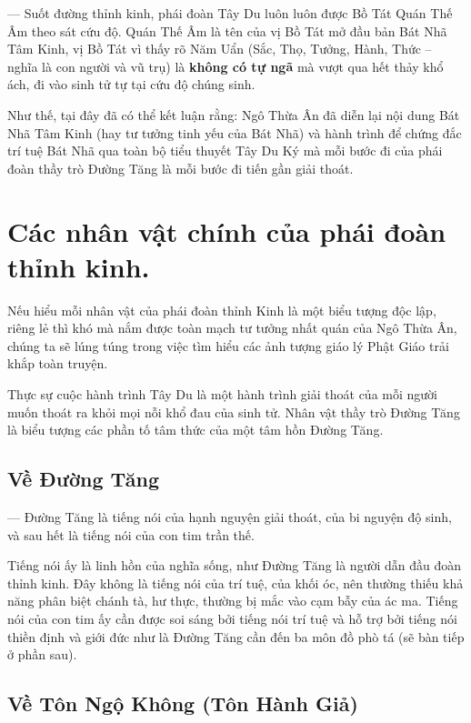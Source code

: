 --- Suốt đường thỉnh kinh, phái đoàn Tây Du luôn luôn được Bồ Tát Quán Thế Âm theo sát cứu độ. Quán Thế Âm là tên của vị Bồ Tát mở đầu bản Bát Nhã Tâm Kinh, vị Bồ Tát vì thấy rõ Năm Uẩn (Sắc, Thọ, Tưởng, Hành, Thức -- nghĩa là con người và vũ trụ) là {\bf không có tự ngã} mà vượt qua hết thảy khổ ách, đi vào sinh tử tự tại cứu độ chúng sinh.

Như thế, tại đây đã có thể kết luận rằng: Ngô Thừa Ân đã diễn lại nội dung Bát Nhã Tâm Kinh (hay tư tưởng tinh yếu của Bát Nhã) và hành trình để chứng đắc trí tuệ Bát Nhã qua toàn bộ tiểu thuyết Tây Du Ký mà mỗi bước đi của phái đoàn thầy trò Đường Tăng là mỗi bước đi tiến gần giải thoát.

\section{Các nhân vật chính của phái đoàn thỉnh kinh.} %
\label{sec:cac_nhan_vat_chinh_cua_phai_doan_thinh_kinh}

Nếu hiểu mỗi nhân vật của phái đoàn thỉnh Kinh là một biểu tượng độc lập, riêng lẻ thì khó mà nắm được toàn mạch tư tưởng nhất quán của Ngô Thừa Ân, chúng ta sẽ lúng túng trong việc tìm hiểu các ảnh tượng giáo lý Phật Giáo trải khắp toàn truyện.

Thực sự cuộc hành trình Tây Du là một hành trình giải thoát của mỗi người muốn thoát ra khỏi mọi nỗi khổ đau của sinh tử. Nhân vật thầy trò Đường Tăng là biểu tượng các phần tố tâm thức của một tâm hồn Đường Tăng.

\subsection{Về Đường Tăng} %
\label{sub:ve_duong_tang}

---  Đường Tăng là tiếng nói của hạnh nguyện giải thoát, của bi nguyện độ sinh, và sau hết là tiếng nói của con tim trần thế.

Tiếng nói ấy là linh hồn của nghĩa sống, như Đường Tăng là người dẫn đầu đoàn thỉnh kinh. Đây không là tiếng nói của trí tuệ, của khối óc, nên thường thiếu khả năng phân biệt chánh tà, hư thực, thường bị mắc vào cạm bẫy của ác ma. Tiếng nói của con tim ấy cần được soi sáng bởi tiếng nói trí tuệ và hỗ trợ bởi tiếng nói thiền định và giới đức như là Đường Tăng cần đến ba môn đồ phò tá (sẽ bàn tiếp ở phần sau).

\subsection{Về Tôn Ngộ Không (Tôn Hành Giả)} %
\label{sub:ve_ton_ngo_khong}

